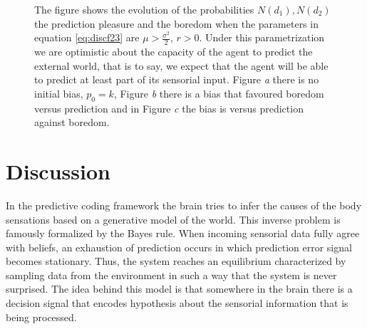 \documentclass[11pt,twocolumn]{article}
\begin{document}
\begin{figure}[H]
    \subfigure[\label{subfig-1:dummy}]{%
      \texttt{[image: r=02k=s-inv.png]}
    }
    \hfill
    \subfigure[\label{subfig-2:dummy}]{%
      \texttt{[image: r=02k=10s-inv.png]}
    }
    \hfill
    \subfigure[\label{subfig-3:dummy}]{%
      \texttt{[image: r=02s=10k-inv.png]}
    }
    \caption{The figure shows the evolution of the probabilities $N(d_1), N(d_2)$ the prediction pleasure and the boredom when the parameters in equation \ref{eq:discf23} are $ \mu > \frac{\sigma ^2}{2}$, $r>0$. Under this parametrization we are optimistic about the capacity of the agent to predict the external world, that is to say, we expect that the agent will be able to predict at least part of its sensorial input. Figure \emph{a} there is no initial bias, $p_0 = k$, Figure \emph{b} there is a bias that favoured boredom versus prediction and in Figure \emph{c} the bias is versus  prediction against boredom. 
     }
    \label{fig:sims2}
\end{figure}
\section{Discussion}
\label{se:dis}

In the predictive coding framework the brain tries to infer the causes of the body sensations based on a generative model of the world. This inverse problem is famously formalized by the Bayes rule. When incoming sensorial data fully agree with beliefs, an exhaustion of prediction occurs in which prediction error signal becomes stationary. Thus, the system reaches an equilibrium characterized by sampling data from the environment in such a way that the system is never surprised. The idea behind this model is that somewhere in the brain there is a decision signal that encodes hypothesis about the sensorial information that is being processed. 
\end{document}
